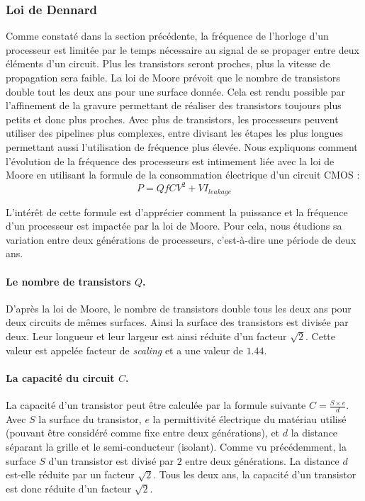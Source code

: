 \subsubsection{Loi de Dennard}\label{sec:denard}
Comme constaté dans la section précédente, la fréquence de l'horloge d'un processeur est limitée par le temps nécessaire au signal de se propager entre deux éléments d'un circuit. Plus les transistors seront proches, plus la vitesse de propagation sera faible. La loi de Moore prévoit que le nombre de transistors double tout les deux ans pour une surface donnée. Cela est rendu possible par l'affinement de la gravure permettant de réaliser des transistors toujours plus petits et donc plus proches. Avec plus de transistors, les processeurs peuvent utiliser des pipelines plus complexes, entre divisant les étapes les plus longues permettant aussi l'utilisation de fréquence plus élevée. Nous expliquons comment l'évolution de la fréquence des processeurs est intimement liée avec la loi de Moore en utilisant la formule de la consommation électrique d'un circuit CMOS \cite{martin2014post}:
\begin{equation}
P = QfCV^{2} +  VI_{leakage}
\label{eq:power}
\end{equation}


L'intérêt de cette formule est d'apprécier comment la puissance et la fréquence d'un processeur est impactée par la loi de Moore. Pour cela, nous étudions sa variation entre deux générations de processeurs, c'est-à-dire une période de deux ans.


\paragraph{Le nombre de transistors $Q$.} D'après la loi de Moore, le nombre de transistors double tous les deux ans pour deux circuits de mêmes surfaces. Ainsi la surface des transistors est divisée par deux. Leur longueur et  leur largeur est ainsi réduite d'un facteur $\sqrt{2}$. Cette valeur est appelée facteur de \textit{scaling} et a une valeur de $1.44$.

\paragraph{La capacité du circuit $C$.} La capacité d'un transistor peut être calculée par la formule suivante $C = \frac{S \times e}{d}$. Avec $S$ la surface du transistor, $e$ la permittivité électrique du matériau utilisé (pouvant être considéré comme fixe entre deux générations), et $d$ la distance séparant la grille et le semi-conducteur (isolant). Comme vu précédemment, la surface $S$ d'un transistor est divisé par $2$ entre deux générations. La distance $d$ est-elle réduite par un facteur $\sqrt{2}$. Tous les deux ans, la capacité d'un transistor est donc réduite d’un facteur $\sqrt{2}$. 

